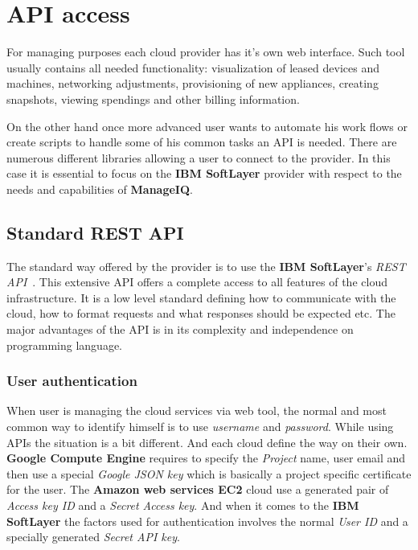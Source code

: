 \section{API access}
\label{sec:API access}

For managing purposes each cloud provider has it's own web interface. Such tool usually contains all needed functionality: visualization of leased devices and machines, networking adjustments, provisioning of new appliances, creating snapshots, viewing spendings and other billing information.

On the other hand once more advanced user wants to automate his work flows or create scripts to handle some of his common tasks an API is needed. There are numerous different libraries allowing a user to connect to the provider. In this case it is essential to focus on the \textbf{IBM SoftLayer} provider with respect to the needs and capabilities of \textbf{ManageIQ}.

\subsection{Standard REST API}
\label{sub:Standard REST API}

The standard way offered by the provider is to use the \textbf{IBM SoftLayer}'s \emph{REST API}~\cite{restapi}. This extensive API offers a complete access to all features of the cloud infrastructure. It is a low level standard defining how to communicate with the cloud, how to format requests and what responses should be expected etc. The major advantages of the API is in its complexity and independence on programming language.

\subsubsection{User authentication}
\label{subs:User authentication}

When user is managing the cloud services via web tool, the normal and most common way to identify himself is to use \emph{username} and \emph{password}. While using APIs the situation is a bit different. And each cloud define the way on their own. \textbf{Google Compute Engine} requires to specify the \emph{Project} name, user email and then use a special \emph{Google JSON key} which is basically a project specific certificate for the user. The \textbf{Amazon web services EC2} cloud use a generated pair of \emph{Access key ID} and a \emph{Secret Access key}. And when it comes to the \textbf{IBM SoftLayer} the factors used for authentication involves the normal \emph{User ID} and a specially generated \emph{Secret API key}.


